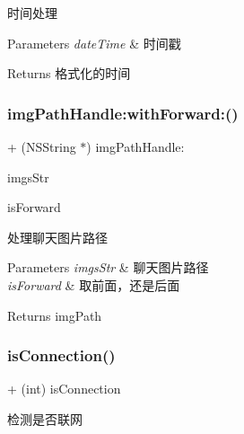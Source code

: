 时间处理


\begin{DoxyParams}{Parameters}
{\em date\+Time} & 时间戳\\
\hline
\end{DoxyParams}
\begin{DoxyReturn}{Returns}
格式化的时间 
\end{DoxyReturn}
\mbox{\label{interface_tools_aecf6c8b3eac4e47295e0c89fcbb3cbc3}} 
\subsubsection{\texorpdfstring{img\+Path\+Handle\+:with\+Forward\+:()}{imgPathHandle:withForward:()}}
{\footnotesize\ttfamily + (N\+S\+String $\ast$) img\+Path\+Handle\+: \begin{DoxyParamCaption}\item[{(N\+S\+String$\ast$)}]{imgs\+Str }\item[{withForward:(B\+O\+OL)}]{is\+Forward }\end{DoxyParamCaption}}

处理聊天图片路径


\begin{DoxyParams}{Parameters}
{\em imgs\+Str} & 聊天图片路径 \\
\hline
{\em is\+Forward} & 取前面，还是后面\\
\hline
\end{DoxyParams}
\begin{DoxyReturn}{Returns}
img\+Path 
\end{DoxyReturn}
\mbox{\label{interface_tools_a72688197a3180b11a3d2fcb4f0719838}} 
\subsubsection{\texorpdfstring{is\+Connection()}{isConnection()}}
{\footnotesize\ttfamily + (int) is\+Connection \begin{DoxyParamCaption}{ }\end{DoxyParamCaption}}

检测是否联网


